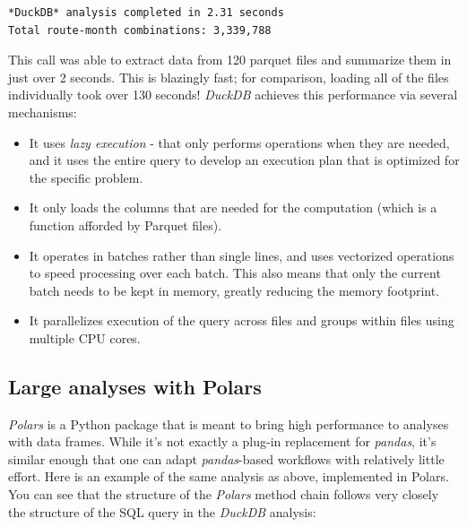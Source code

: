 \begin{lstlisting}[style=shellshort]
*DuckDB* analysis completed in 2.31 seconds
Total route-month combinations: 3,339,788
\end{lstlisting}

This call was able to extract data from 120 parquet files and summarize them in just over 2 seconds.  This is blazingly fast; for comparison, loading all of the files individually took over 130 seconds!  \textit{DuckDB} achieves this performance via several mechanisms:

\begin{itemize}
\item It uses \textit{lazy execution} - that only performs operations when they are needed, and it uses the entire query to develop an execution plan that is optimized for the specific problem.
\item It only loads the columns that are needed for the computation (which is a function afforded by Parquet files).
\item It operates in batches rather than single lines, and uses vectorized operations to speed processing over each batch.  This also means that only the current batch needs to be kept in memory, greatly reducing the memory footprint.
\item It parallelizes execution of the query across files and groups within files using multiple CPU cores.
\end{itemize}

\subsection{Large analyses with Polars}

\textit{Polars} is a Python package that is meant to bring high performance to analyses with data frames. While it's not exactly a plug-in replacement for \textit{pandas}, it's similar enough that one can adapt \textit{pandas}-based workflows with relatively little effort.  Here is an example of the same analysis as above, implemented in Polars. You can see that the structure of the \textit{Polars} method chain follows very closely the structure of the SQL query in the \textit{DuckDB} analysis:

